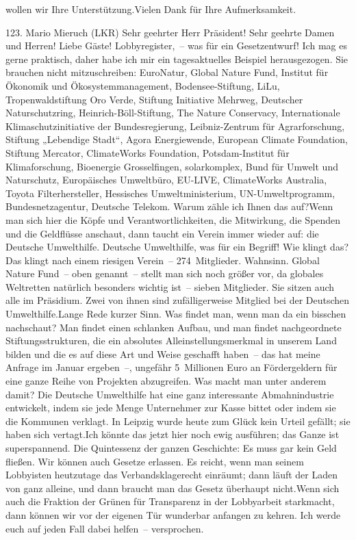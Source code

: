 \documentclass{article}
\begin{document}
wollen wir Ihre Unterstützung.Vielen Dank für Ihre Aufmerksamkeit.




	123. Mario Mieruch (LKR) Sehr geehrter Herr Präsident! Sehr geehrte Damen und Herren! Liebe Gäste! Lobbyregister, – was für ein Gesetzentwurf! Ich mag es gerne praktisch, daher habe ich mir ein tagesaktuelles Beispiel herausgezogen. Sie brauchen nicht mitzuschreiben: EuroNatur, Global Nature Fund, Institut für Ökonomik und Ökosystemmanagement, Bodensee-Stiftung, LiLu, Tropenwaldstiftung Oro Verde, Stiftung Initiative Mehrweg, Deutscher Naturschutzring, Heinrich-Böll-Stiftung, The Nature Conservacy, Internationale Klimaschutzinitiative der Bundesregierung, Leibniz-­Zentrum für Agrarforschung, Stiftung „Lebendige Stadt“, Agora Energiewende, European Climate Foundation, Stiftung Mercator, ClimateWorks Foundation, Potsdam-Institut für Klimaforschung, Bioenergie Grosselfingen, solarkomplex, Bund für Umwelt und Naturschutz, Europäisches Umweltbüro, EU-LIVE, ClimateWorks Australia, Toyota Filterhersteller, Hessisches Umweltministerium, UN-Umweltprogramm, Bundesnetzagentur, Deutsche Telekom. Warum zähle ich Ihnen das auf?Wenn man sich hier die Köpfe und Verantwortlichkeiten, die Mitwirkung, die Spenden und die Geldflüsse anschaut, dann taucht ein Verein immer wieder auf: die Deutsche Umwelthilfe. Deutsche Umwelthilfe, was für ein Begriff! Wie klingt das? Das klingt nach einem riesigen Verein – 274 Mitglieder. Wahnsinn. Global Nature Fund – oben genannt – stellt man sich noch größer vor, da globales Weltretten natürlich besonders wichtig ist – sieben Mitglieder. Sie sitzen auch alle im Präsidium. Zwei von ihnen sind zufälligerweise Mitglied bei der Deutschen Umwelthilfe.Lange Rede kurzer Sinn. Was findet man, wenn man da ein bisschen nachschaut? Man findet einen schlanken Aufbau, und man findet nachgeordnete Stiftungsstrukturen, die ein absolutes Alleinstellungsmerkmal in unserem Land bilden und die es auf diese Art und Weise geschafft haben – das hat meine Anfrage im Januar ergeben –, ungefähr 5 Millionen Euro an Fördergeldern für eine ganze Reihe von Projekten abzugreifen. Was macht man unter anderem damit? Die Deutsche Umwelthilfe hat eine ganz interessante Abmahnindustrie entwickelt, indem sie jede Menge Unternehmer zur Kasse bittet oder indem sie die Kommunen verklagt. In Leipzig wurde heute zum Glück kein Urteil gefällt; sie haben sich vertagt.Ich könnte das jetzt hier noch ewig ausführen; das Ganze ist superspannend. Die Quintessenz der ganzen Geschichte: Es muss gar kein Geld fließen. Wir können auch Gesetze erlassen. Es reicht, wenn man seinem Lobbyisten heutzutage das Verbandsklagerecht einräumt; dann läuft der Laden von ganz alleine, und dann braucht man das Gesetz überhaupt nicht.Wenn sich auch die Fraktion der Grünen für Transparenz in der Lobbyarbeit starkmacht, dann können wir vor der eigenen Tür wunderbar anfangen zu kehren. Ich werde euch auf jeden Fall dabei helfen – versprochen.
\end{document}
